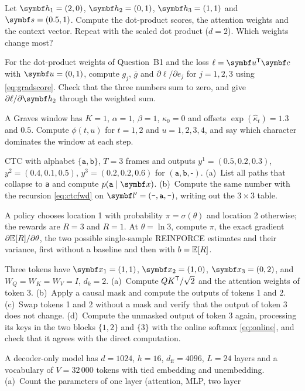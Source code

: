 \documentclass[11pt]{article}
\newcommand{\hv}{\vect{h}}
\newcommand{\sv}{\vect{s}}
\newcommand{\cv}{\vect{c}}
\newcommand{\uv}{\vect{u}}
\newcommand{\blank}{\texttt{-}}
\begin{document}
\begin{questions}
\begin{calculations}
\item Let $\hv_1 = (2, 0)$, $\hv_2 = (0, 1)$, $\hv_3 = (1, 1)$ and $\sv = (0.5, 1)$. Compute the dot-product scores, the
  attention weights and the context vector. Repeat with the scaled dot product ($d = 2$). Which weights change most?
\item For the dot-product weights of Question~B1 and the loss $\ell = \uv\T\cv$ with $\uv = (0, 1)$, compute $g_j$, $\bar g$
  and $\partial\ell/\partial e_j$ for $j = 1, 2, 3$ using \eqref{eq:gradscore}. Check that the three numbers sum to zero, and
  give $\partial\ell/\partial\hv_2$ through the weighted sum.
\item A Graves window has $K = 1$, $\alpha = 1$, $\beta = 1$, $\kappa_0 = 0$ and offsets $\exp(\hat{\kappa}_t) = 1.3$ and
  $0.5$. Compute $\phi(t, u)$ for $t = 1, 2$ and $u = 1, 2, 3, 4$, and say which character dominates the window at each step.
\item CTC with alphabet $\{\texttt{a}, \texttt{b}\}$, $T = 3$ frames and outputs $y^1 = (0.5, 0.2, 0.3)$,
  $y^2 = (0.4, 0.1, 0.5)$, $y^3 = (0.2, 0.2, 0.6)$ for $(\texttt{a}, \texttt{b}, \blank)$. (a)~List all paths that collapse
  to \texttt{a} and compute $p(\texttt{a} \mid \x)$. (b)~Compute the same number with the recursion \eqref{eq:ctcfwd} on
  $\vect{l}' = (\blank, \texttt{a}, \blank)$, writing out the $3 \times 3$ table.
\item A policy chooses location 1 with probability $\pi = \sigma(\theta)$ and location 2 otherwise; the rewards are $R = 3$
  and $R = 1$. At $\theta = \ln 3$, compute $\pi$, the exact gradient $\partial\mathbb{E}[R]/\partial\theta$, the two possible
  single-sample REINFORCE estimates and their variance, first without a baseline and then with $b = \mathbb{E}[R]$.
\item Three tokens have $\x_1 = (1, 1)$, $\x_2 = (1, 0)$, $\x_3 = (0, 2)$, and $W_Q = W_K = W_V = I$, $d_k = 2$.
  (a)~Compute $QK^{\mathsf{T}}/\sqrt{2}$ and the attention weights of token 3. (b)~Apply a causal mask and compute the outputs of tokens
  1 and 2. (c)~Swap tokens 1 and 2 without a mask and verify that the output of token 3 does not change. (d)~Compute the
  unmasked output of token 3 again, processing its keys in the two blocks $\{1, 2\}$ and $\{3\}$ with the online softmax
  \eqref{eq:online}, and check that it agrees with the direct computation.
\item A decoder-only model has $d = 1024$, $h = 16$, $d_{\mathrm{ff}} = 4096$, $L = 24$ layers and a vocabulary of
  $V = 32\,000$ tokens with tied embedding and unembedding. (a)~Count the parameters of one layer (attention, MLP, two layer

\end{calculations}
\end{questions}
\end{document}
